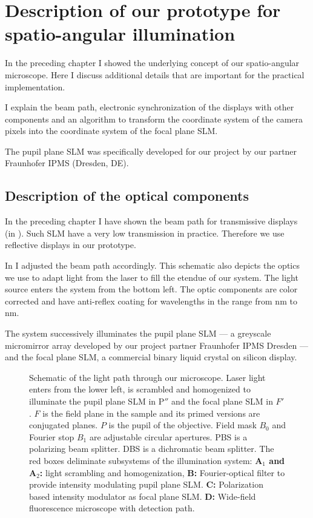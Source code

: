 
\chapter{Description of our prototype for spatio-angular illumination}
\label{sec:dev1}
\begin{summary}
  In the preceding chapter I showed the underlying concept of our
  spatio-angular microscope. Here I discuss additional details that
  are important for the practical implementation.

  I explain the beam path, electronic synchronization of the displays
  with other components and an algorithm to transform the coordinate
  system of the camera pixels into the coordinate system of the focal
  plane SLM.
  
  The pupil plane SLM was specifically developed for our project by    
  our partner Fraunhofer IPMS (Dresden, DE). 
\end{summary}
\section{Description of the optical components}
In the preceding chapter I have shown the beam path for
transmissive displays (in ). Such SLM have a
very low transmission in practice. Therefore we use reflective
displays in our prototype.

In  I adjusted the beam path accordingly. This
schematic also depicts the optics we use to adapt light from the laser
to fill the etendue of our system. The light source enters the system
from the bottom left. The optic components are color corrected and
have anti-reflex coating for wavelengths in the range from
\unit[400]{nm} to \unit[700]{nm}.

The system successively illuminates the pupil plane SLM --- a greyscale
micromirror array developed by our project partner Fraunhofer IPMS
Dresden --- and the focal plane SLM, a commercial binary liquid crystal
on silicon display.
 
\begin{figure}[!htbp]
  \centering
  \caption{Schematic of the light path through our microscope. Laser
    light enters from the lower left, is scrambled and homogenized to
    illuminate the pupil plane SLM in $\textrm{P}''$ and the focal
    plane SLM in $F'$. $F$ is the field plane in the sample and its
    primed versions are conjugated planes. $P$ is the pupil of the
    objective. Field mask $B_0$ and Fourier stop $B_1$ are adjustable
    circular apertures. PBS is a polarizing beam splitter. DBS is a
    dichromatic beam splitter.  The red boxes deliminate subsystems of
    the illumination system: {\color{Orchid}\bf A$_1$ and A$_2$:}
    light scrambling and homogenization, {\color{Orchid}\bf B:}
    Fourier-optical filter to provide intensity modulating pupil plane
    SLM. {\color{Orchid}\bf C:} Polarization based intensity modulator
    as focal plane SLM. {\color{Orchid}\bf D:} Wide-field fluorescence
    microscope with detection path.}
  \label{fig:memi-real}
\end{figure}

